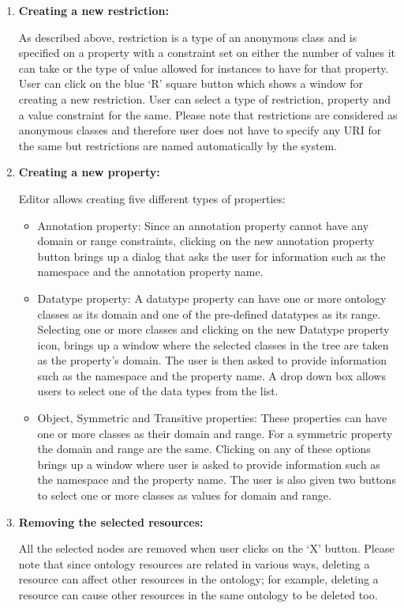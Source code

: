 {\begin{enumerate}
\item \textbf{Creating a new restriction:}

As described above, restriction is a type of an anonymous class and is specified
on a property with a constraint set on either the number of values it can take
or the type of value allowed for instances to have for that property.  User can
click on the blue `R' square button which shows a window for creating a new
restriction.  User can select a type of restriction, property and a value
constraint for the same.  Please note that restrictions are considered as
anonymous classes and therefore user does not have to specify any URI for the
same but restrictions are named automatically by the system.

\item \textbf{Creating a new property:}

Editor allows creating five different types of properties:
\begin{itemize}
\item Annotation property: Since an annotation property cannot have any domain 
or range constraints, clicking on the new annotation property button brings up a
dialog that asks the user for information such as the namespace and the 
annotation property name.
\item Datatype property: A datatype property can have one or more ontology 
classes as its domain and one of the pre-defined datatypes as its range. 
Selecting one or more classes and clicking on the new Datatype property icon, 
brings up a window where the selected classes in the tree are taken as the 
property's domain. The user is then asked to provide information such as the 
namespace and the property name.  A drop down box allows users to select one of 
the data types from the list.
\item Object, Symmetric and Transitive properties:  These properties can have 
one or more classes as their domain and range.  For a symmetric property the 
domain and range are the same.  Clicking on any of these options brings up a 
window where user is asked to provide information such as the namespace and the 
property name.  The user is also given two buttons to select one or more classes
as values for domain and range.
\end{itemize}

\item \textbf{Removing the selected resources:}

All the selected nodes are removed when user clicks on the `X' button.  Please
note that since ontology resources are related in various ways,
deleting a resource can affect other resources in the ontology;
for example, deleting a resource can cause other resources
in the same ontology to be deleted too.


\end{enumerate}}

